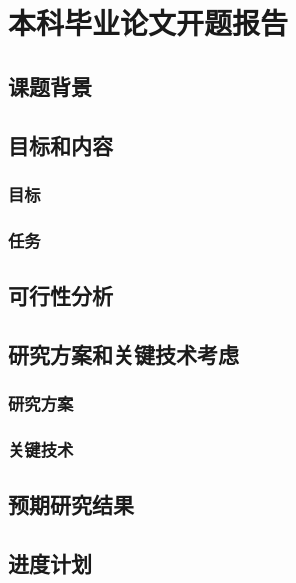 \chapter{本科毕业论文开题报告}

\section{课题背景}
\section{目标和内容}
\subsection{目标}
\subsection{任务}
\section{可行性分析}
\section{研究方案和关键技术考虑}
\subsection{研究方案}
\subsection{关键技术}
\section{预期研究结果}
\section{进度计划}
